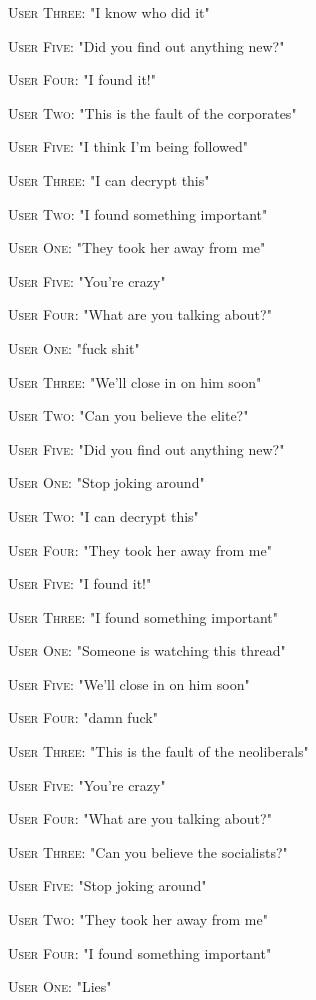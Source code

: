 \documentclass{report}
\begin{document}
\textsc{User Three}: "I know who did it" 

\textsc{User Five}: "Did you find out anything new?" 

\textsc{User Four}: "I found it!" 

\textsc{User Two}: "This is the fault of the corporates" 

\textsc{User Five}: "I think I'm being followed" 

\textsc{User Three}: "I can decrypt this" 

\textsc{User Two}: "I found something important" 

\textsc{User One}: "They took her away from me" 

\textsc{User Five}: "You're crazy" 

\textsc{User Four}: "What are you talking about?" 

\textsc{User One}: "fuck shit" 

\textsc{User Three}: "We'll close in on him soon" 

\textsc{User Two}: "Can you believe the elite?" 

\textsc{User Five}: "Did you find out anything new?" 

\textsc{User One}: "Stop joking around" 

\textsc{User Two}: "I can decrypt this" 

\textsc{User Four}: "They took her away from me" 

\textsc{User Five}: "I found it!" 

\textsc{User Three}: "I found something important" 

\textsc{User One}: "Someone is watching this thread" 

\textsc{User Five}: "We'll close in on him soon" 

\textsc{User Four}: "damn fuck" 

\textsc{User Three}: "This is the fault of the neoliberals" 

\textsc{User Five}: "You're crazy" 

\textsc{User Four}: "What are you talking about?" 

\textsc{User Three}: "Can you believe the socialists?" 

\textsc{User Five}: "Stop joking around" 

\textsc{User Two}: "They took her away from me" 

\textsc{User Four}: "I found something important" 

\textsc{User One}: "Lies" 
\end{document}
